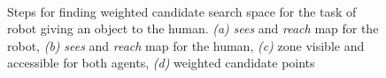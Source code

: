 \documentclass{svmult}
\begin{document}
\begin{figure}[ht!]
   \begin{center}
       \\ %
	\end{center}

   \caption{
	Steps for finding weighted candidate search space for the task of robot
	giving an object to the human. {\it(a)} \emph{sees} and \emph{reach} map
	for the robot, {\it(b)} \emph{sees} and \emph{reach} map for the human,
	{\it(c)} zone visible and accessible for both agents, {\it(d)} weighted
	candidate points}
		
   \label{fig|mightabilities-steps}
\end{figure}
\end{document}
